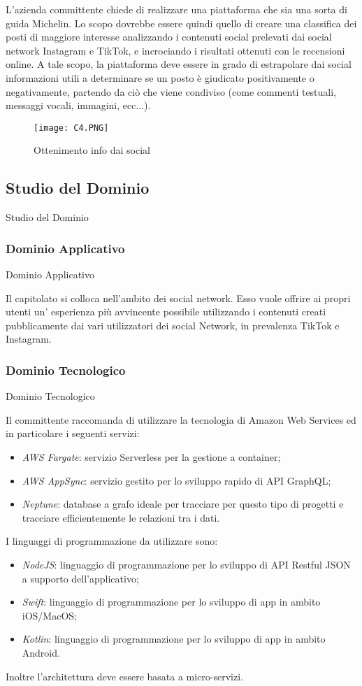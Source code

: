 \documentclass[11pt]{article}
\begin{document}
    L’azienda committente chiede di realizzare una piattaforma che sia una sorta di guida Michelin. Lo scopo dovrebbe essere quindi quello di creare una classifica dei posti di maggiore interesse analizzando i contenuti social prelevati dai social network Instagram e TikTok, e incrociando i risultati ottenuti con le recensioni online. A tale scopo, la piattaforma deve essere in grado di estrapolare dai social informazioni utili a determinare se un posto è giudicato positivamente o negativamente, partendo da ciò che viene condiviso (come commenti testuali, messaggi vocali, immagini, ecc...).
    
    \begin{figure}[h!]
        \centering
        \texttt{[image: C4.PNG]}
        \caption{Ottenimento info dai social}
        \label{GuidaMIchelin}
    \end{figure}
    
    \subsection{Studio del Dominio} Studio del Dominio
        \subsubsection{Dominio Applicativo} Dominio Applicativo
        
        Il capitolato si colloca nell'ambito dei social network.
        Esso vuole offrire ai propri utenti un' esperienza più avvincente possibile utilizzando i contenuti creati pubblicamente dai vari utilizzatori dei social Network, in prevalenza TikTok e Instagram.
        \subsubsection{Dominio Tecnologico} Dominio Tecnologico
        
        Il committente raccomanda di utilizzare la tecnologia di Amazon Web Services ed in particolare i seguenti servizi:
		\begin{itemize}
			\item \textit{AWS Fargate}: servizio Serverless per la gestione a container;
			\item \textit{AWS AppSync}: servizio gestito per lo sviluppo rapido di API GraphQL;
			\item \textit{Neptune}: database a grafo ideale per tracciare per questo tipo di progetti e tracciare efficientemente le relazioni tra i dati.
		\end{itemize}
		I linguaggi di programmazione da utilizzare sono:
		\begin{itemize}
			\item \textit{NodeJS}: linguaggio di programmazione per lo sviluppo di API Restful JSON a supporto dell’applicativo;
			\item \textit{Swift}: linguaggio di programmazione per lo sviluppo di app in ambito iOS/MacOS;
			\item \textit{Kotlin}: linguaggio di programmazione per lo sviluppo di app in ambito Android.
		\end{itemize}
		Inoltre l’architettura deve essere basata a micro-servizi.
    
\end{document}
